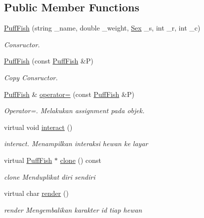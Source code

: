 \subsection*{Public Member Functions}
\begin{DoxyCompactItemize}
\item 
\hyperlink{classPuffFish_aafea19bb86fb11ccd0736d97c23a4475}{Puff\+Fish} (string \+\_\+name, double \+\_\+weight, \hyperlink{sex_8h_a2633cb393c68bb2ee8080db58fb7ba93}{Sex} \+\_\+s, int \+\_\+r, int \+\_\+c)
\begin{DoxyCompactList}\small\item\em Consructor. \end{DoxyCompactList}\item 
\hyperlink{classPuffFish_a1379ba33f40ea4164b795dc5839445aa}{Puff\+Fish} (const \hyperlink{classPuffFish}{Puff\+Fish} \&P)
\begin{DoxyCompactList}\small\item\em Copy Consructor. \end{DoxyCompactList}\item 
\hyperlink{classPuffFish}{Puff\+Fish} \& \hyperlink{classPuffFish_ab3fd8767ee1571a35f472bd363275079}{operator=} (const \hyperlink{classPuffFish}{Puff\+Fish} \&P)
\begin{DoxyCompactList}\small\item\em Operator=. Melakukan assignment pada objek. \end{DoxyCompactList}\item 
virtual void \hyperlink{classPuffFish_abf242b48a31ec87e38d2c8d13d8470d4}{interact} ()
\begin{DoxyCompactList}\small\item\em interact. Menampilkan interaksi hewan ke layar \end{DoxyCompactList}\item 
virtual \hyperlink{classPuffFish}{Puff\+Fish} $\ast$ \hyperlink{classPuffFish_a4e8098eefcedd557fe9e490646ef14d9}{clone} () const 
\begin{DoxyCompactList}\small\item\em clone Menduplikat diri sendiri \end{DoxyCompactList}\item 
virtual char \hyperlink{classPuffFish_ae9b8d83c4f05909f28b62d69de792799}{render} ()
\begin{DoxyCompactList}\small\item\em render Mengembalikan karakter id tiap hewan \end{DoxyCompactList}\item 

\end{DoxyCompactItemize}
